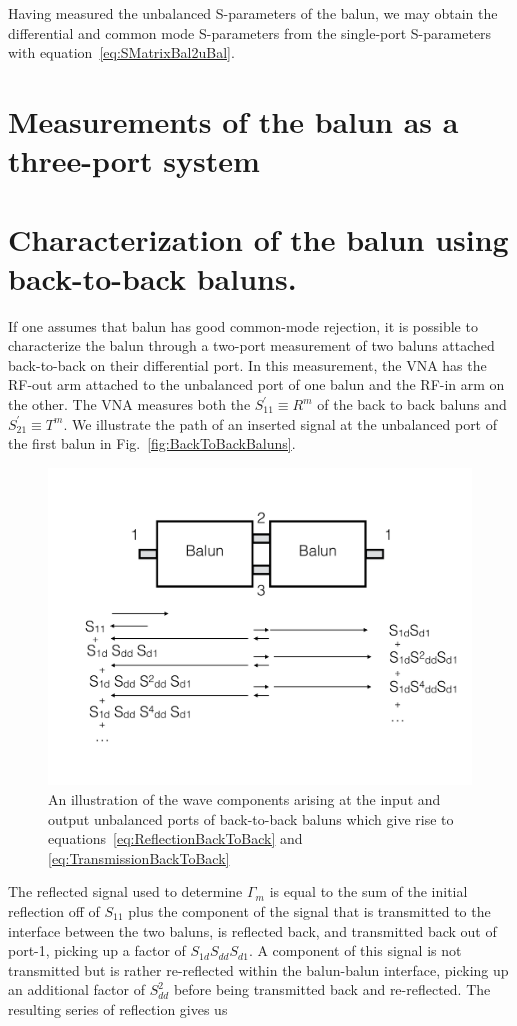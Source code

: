 \documentclass[preprint]{aastex}
\begin{document}
Having measured the unbalanced S-parameters of the balun, we may obtain the differential and common mode S-parameters from the single-port S-parameters with equation~\ref{eq:SMatrixBal2uBal}.
\section{Measurements of the balun as a three-port system}\label{sec:BalunMeasurements}
\section{Characterization of the balun using back-to-back baluns.}
If one assumes that balun has good common-mode rejection, it is possible to characterize the balun through a two-port measurement of two baluns attached back-to-back on their differential port. In this measurement, the VNA has the RF-out arm attached to the unbalanced port of one balun and the RF-in arm on the other. The VNA measures both the $S_{11}^\prime \equiv R^m$ of the back to back baluns and $S_{21}^\prime \equiv T^m$. We illustrate the path of an inserted signal at the unbalanced port of the first balun in Fig.~\ref{fig:BackToBackBaluns}. 
\begin{figure}
\includegraphics[width=\textwidth]{back_to_back_baluns.pdf}
\caption{An illustration of the wave components arising at the input and output unbalanced ports of back-to-back baluns which give rise to equations~\ref{eq:ReflectionBackToBack} and \ref{eq:TransmissionBackToBack}}
\end{figure}
The reflected signal used to determine $\Gamma_m$ is equal to the sum of the initial reflection off of $S_{11}$ plus the component of the signal that is transmitted to the interface between the two baluns, is reflected back, and transmitted back out of port-1, picking up a factor of $S_{1d} S_{dd} S_{d1}$. A component of this signal is not transmitted but is rather re-reflected within the balun-balun interface, picking up an additional factor of $S_{dd}^2$ before being transmitted back and re-reflected. The resulting series of reflection gives us 
\end{document}
